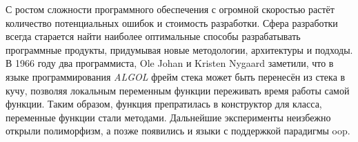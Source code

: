
С ростом сложности программного обеспечения с огромной скоростью растёт количество потенциальных ошибок и стоимость разработки. Сфера разработки всегда старается найти наиболее оптимальные способы разрабатывать программные продукты, придумывая новые методологии, архитектуры и подходы. В 1966 году два программиста, Ole Johan и Kristen Nygaard заметили, что в языке программирования \textit{ALGOL} фрейм стека может быть перенесён из стека в кучу, позволяя локальным переменным функции переживать время работы самой функции. Таким образом, функция препратилась в конструктор для класса, переменные функции стали методами. Дальнейшие эксперименты неизбежно открыли полиморфизм, а позже появились и языки с поддержкой парадигмы \gls{oop}.